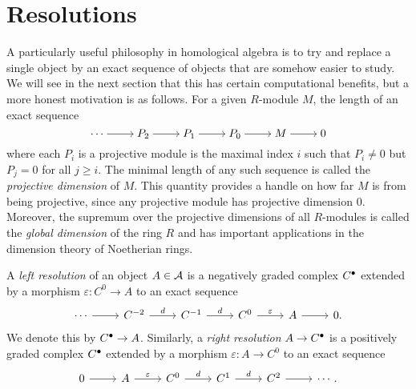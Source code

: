 \section{Resolutions}
\label{sect_resolutions}

A particularly useful philosophy in homological algebra is to try and
replace a single object by an exact sequence of objects that are
somehow easier to study.
We will see in the next section that this has certain computational
benefits, but a more honest motivation is as follows.
For a given $R$-module $M$, the length of an exact sequence
\[
  \begin{tikzcd}[cramped]
    \cdots & {P_2} & {P_1} & {P_0} & M & 0
    \arrow[from=1-1, to=1-2]
    \arrow[from=1-2, to=1-3]
    \arrow[from=1-3, to=1-4]
    \arrow[from=1-4, to=1-5]
    \arrow[from=1-5, to=1-6]
  \end{tikzcd}
\]
where each $P_i$ is a projective module is the maximal index $i$ such
that $P_i \neq 0$ but $P_j = 0$ for all $j \geq i$.
The minimal length of any such sequence is called the
\emph{projective dimension} of $M$.
This quantity provides a handle on how far $M$ is from being
projective, since any projective module has projective dimension 0.
Moreover, the supremum over the projective dimensions of all
$R$-modules is called the \emph{global dimension} of the ring $R$ and
has important applications in the dimension theory of Noetherian rings.

\begin{definition}
  A \emph{left resolution} of an object $A \in \mathcal{A}$ is a
  negatively graded complex ${{C}}^{\bullet}$ extended by a morphism
  $\varepsilon: C^0 \to A$ to an exact sequence
  \[
    \begin{tikzcd}
      \cdots & {C^{-2}} & {C^{-1}} & {C^0} & A & 0.
      \arrow[from=1-1, to=1-2]
      \arrow["{d}", from=1-2, to=1-3]
      \arrow["{d}", from=1-3, to=1-4]
      \arrow["\varepsilon", from=1-4, to=1-5]
      \arrow[from=1-5, to=1-6]
    \end{tikzcd}
  \]
  We denote this by ${{C}}^{\bullet} \to A$.
  Similarly, a \emph{right resolution} $A \to {{C}}^{\bullet}$  is a
  positively graded complex ${{C}}^{\bullet}$ extended by a morphism
  $\varepsilon: A \to C^0$ to an exact sequence
  \[
    \begin{tikzcd}
      0 & A & {C^0} & {C^1} & {C^2} & \cdots.
      \arrow[from=1-1, to=1-2]
      \arrow["\varepsilon", from=1-2, to=1-3]
      \arrow["{d}", from=1-3, to=1-4]
      \arrow["{d}", from=1-4, to=1-5]
      \arrow[from=1-5, to=1-6]
    \end{tikzcd}
  \]
  \vspace{-24pt}
\end{definition}

